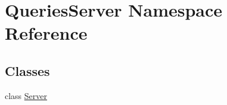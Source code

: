 \hypertarget{namespace_queries_server}{}\section{Queries\+Server Namespace Reference}
\label{namespace_queries_server}
\subsection*{Classes}
\begin{DoxyCompactItemize}
\item 
class \mbox{\hyperlink{class_queries_server_1_1_server}{Server}}
\end{DoxyCompactItemize}
